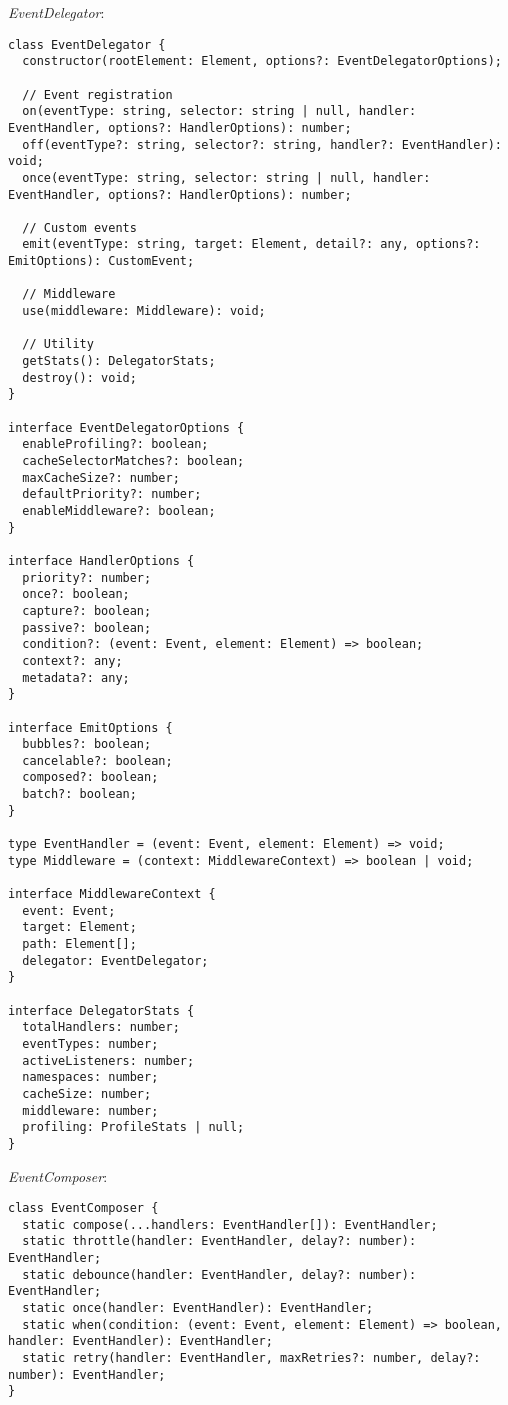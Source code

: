 \documentclass[11pt]{article}
\begin{document}
\emph{EventDelegator}:

\begin{verbatim}
class EventDelegator {
  constructor(rootElement: Element, options?: EventDelegatorOptions);
  
  // Event registration
  on(eventType: string, selector: string | null, handler: EventHandler, options?: HandlerOptions): number;
  off(eventType?: string, selector?: string, handler?: EventHandler): void;
  once(eventType: string, selector: string | null, handler: EventHandler, options?: HandlerOptions): number;
  
  // Custom events
  emit(eventType: string, target: Element, detail?: any, options?: EmitOptions): CustomEvent;
  
  // Middleware
  use(middleware: Middleware): void;
  
  // Utility
  getStats(): DelegatorStats;
  destroy(): void;
}

interface EventDelegatorOptions {
  enableProfiling?: boolean;
  cacheSelectorMatches?: boolean;
  maxCacheSize?: number;
  defaultPriority?: number;
  enableMiddleware?: boolean;
}

interface HandlerOptions {
  priority?: number;
  once?: boolean;
  capture?: boolean;
  passive?: boolean;
  condition?: (event: Event, element: Element) => boolean;
  context?: any;
  metadata?: any;
}

interface EmitOptions {
  bubbles?: boolean;
  cancelable?: boolean;
  composed?: boolean;
  batch?: boolean;
}

type EventHandler = (event: Event, element: Element) => void;
type Middleware = (context: MiddlewareContext) => boolean | void;

interface MiddlewareContext {
  event: Event;
  target: Element;
  path: Element[];
  delegator: EventDelegator;
}

interface DelegatorStats {
  totalHandlers: number;
  eventTypes: number;
  activeListeners: number;
  namespaces: number;
  cacheSize: number;
  middleware: number;
  profiling: ProfileStats | null;
}
\end{verbatim}

\emph{EventComposer}:

\begin{verbatim}
class EventComposer {
  static compose(...handlers: EventHandler[]): EventHandler;
  static throttle(handler: EventHandler, delay?: number): EventHandler;
  static debounce(handler: EventHandler, delay?: number): EventHandler;
  static once(handler: EventHandler): EventHandler;
  static when(condition: (event: Event, element: Element) => boolean, handler: EventHandler): EventHandler;
  static retry(handler: EventHandler, maxRetries?: number, delay?: number): EventHandler;
}
\end{verbatim}
\end{document}
